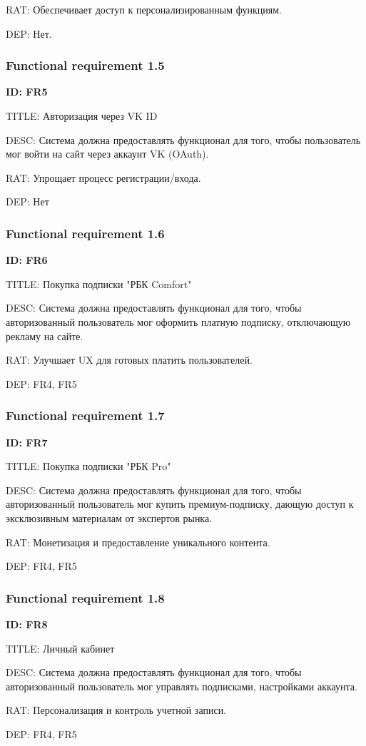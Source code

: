 \documentclass{scrreprt}
\begin{document}
RAT: Обеспечивает доступ к персонализированным функциям.

DEP: Нет.
\subsubsection{Functional requirement 1.5}
\textbf{ID: FR5}

TITLE: Авторизация через VK ID

DESC: Система должна предоставлять функционал для того, чтобы пользователь мог войти на сайт через аккаунт VK (OAuth).

RAT: Упрощает процесс регистрации/входа.

DEP: Нет
\subsubsection{Functional requirement 1.6}
\textbf{ID: FR6}

TITLE: Покупка подписки "РБК Comfort"

DESC: Система должна предоставлять функционал для того, чтобы авторизованный пользователь мог оформить платную подписку, отключающую рекламу на сайте.

RAT: Улучшает UX для готовых платить пользователей.

DEP: FR4, FR5
\subsubsection{Functional requirement 1.7}
\textbf{ID: FR7}

TITLE: Покупка подписки "РБК Pro"

DESC: Система должна предоставлять функционал для того, чтобы авторизованный пользователь мог купить премиум-подписку, дающую доступ к эксклюзивным материалам от экспертов рынка.

RAT: Монетизация и предоставление уникального контента.

DEP: FR4, FR5
\subsubsection{Functional requirement 1.8}
\textbf{ID: FR8}

TITLE: Личный кабинет

DESC: Система должна предоставлять функционал для того, чтобы авторизованный пользователь мог управлять подписками, настройками аккаунта.

RAT: Персонализация и контроль учетной записи.

DEP: FR4, FR5
\end{document}
